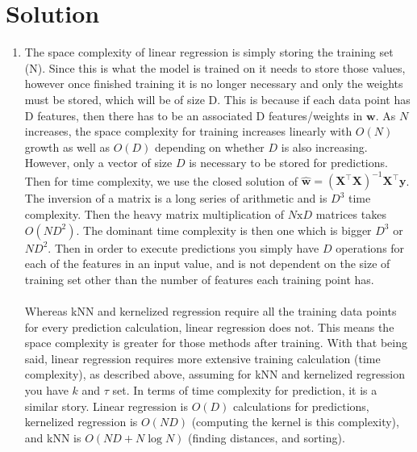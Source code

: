 \documentclass[submit]{harvardml}
\newenvironment{solution}
  {\color{blue}\section*{Solution}}
{}
\begin{document}
\begin{solution}
\begin{enumerate}
            \item The space complexity of linear regression is simply storing the training set (N). Since this is what the model is trained on it needs to store those values, however once finished training it is no longer necessary and only the weights must be stored, which will be of size D. This is because if each data point has D features, then there has to be an associated D features/weights in $\textbf{w}$. As $N$ increases, the space complexity for training increases linearly with $O(N)$ growth as well as $O(D)$ depending on whether $D$ is also increasing. However, only a vector of size $D$ is necessary to be stored for predictions. Then for time complexity, we use the closed solution of $\bm{\hat w} = (\bm X^\top \bm X)^{-1}\bm X^\top \bm y$. The inversion of a matrix is a long series of arithmetic and is $D^3$ time complexity. Then the heavy matrix multiplication of $N\text{x}D$ matrices takes $O(ND^2)$. The dominant time complexity is then one which is bigger $D^3$ or $ND^2$. Then in order to execute predictions you simply have $D$ operations for each of the features in an input value, and is not dependent on the size of training set other than the number of features each training point has.
            \\\\
            Whereas kNN and kernelized regression require all the training data points for every prediction calculation, linear regression does not. This means the space complexity is greater for those methods after training. With that being said, linear regression requires more extensive training calculation (time complexity), as described above, assuming for kNN and kernelized regression you have $k$ and $\tau$ set. In terms of time complexity for prediction, it is a similar story. Linear regression is $O(D)$ calculations for predictions, kernelized regression is $O(ND)$ (computing the kernel is this complexity), and kNN is $O(ND + N\log N)$ (finding distances, and sorting). 


\end{enumerate}
\end{solution}
\end{document}
